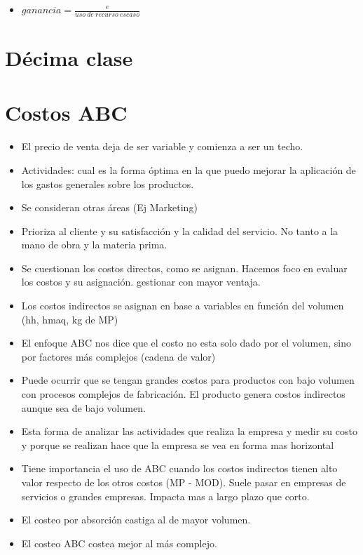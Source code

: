 \documentclass[titlepage,a4paper]{article}
\begin{document}
\begin{itemize}
\item $ganancia = \frac{e}{uso\ de\ recurso\ escaso}$
\end{itemize}




\newpage
\section*{Décima clase}

\section{Costos ABC}

\begin{itemize}
\item El precio de venta deja de ser variable y comienza a ser un techo.
\item Actividades: cual es la forma óptima en la que puedo mejorar la aplicación de los gastos generales sobre los productos.
\item Se consideran otras áreas (Ej Marketing)
\item Prioriza al cliente y su satisfacción y la calidad del servicio. No tanto a la mano de obra y la materia prima.
\item Se cuestionan los costos directos, como se asignan. Hacemos foco en evaluar los costos y su asignación. gestionar con mayor ventaja.
\item Los costos indirectos se asignan en base a variables en función del volumen (hh, hmaq, kg de MP)
\item El enfoque ABC nos dice que el costo no esta solo dado por el volumen, sino por factores más complejos (cadena de valor)
\item Puede ocurrir que se tengan grandes costos para productos con bajo volumen con procesos complejos de fabricación. El producto genera costos indirectos aunque sea de bajo volumen.
\item Esta forma de analizar las actividades que realiza la empresa y medir su costo y porque se realizan hace que la empresa se vea en forma mas horizontal 
\item Tiene importancia el uso de ABC cuando los costos indirectos tienen alto valor respecto de los otros costos (MP - MOD). Suele pasar en empresas de servicios o grandes empresas. Impacta mas a largo plazo que corto.
\item El costeo por absorción castiga al de mayor volumen.
\item El costeo ABC costea mejor al más complejo.
\end{itemize}
\end{document}
